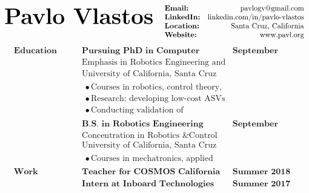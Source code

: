 \documentclass[paper=a4,fontsize=11pt]{article} %
\begin{document}
\begin{align*}
	\text{\fontsize{30}{36}\selectfont \textbf{Pavlo Vlastos}} & \hfill & \begin{array}{lr}
	\textbf{Email:} & \text{pavlogv@gmail.com}\\
	\textbf{LinkedIn:} & \text{linkedin.com/in/pavlo-vlastos}\\
	\textbf{Location:} & \text{Santa Cruz, California}\\
	\textbf{Website:} & \text{www.pavl.org}
	\end{array} 
\end{align*}
%
\begin{align*}
	& \textbf{Education} & & \textbf{Pursuing PhD in Computer Engineering} & \textbf{September 2017 - Current} & \\
	& & & \text{Emphasis in Robotics Engineering and Control Theory} & & \\
	& & & \text{University of California, Santa Cruz} & & \\
	& & & \begin{array}{l} 
		\bullet \, \text{Courses in robotics, control theory, attitude estimation, and embedded programming} \\
		\bullet \, \text{Research: developing low-cost ASVs for oceanography} \\
		\bullet \, \text{Conducting validation of Complementary Filter-based AHRS.}
	\end{array} & & \\
	& & & \textbf{B.S. in Robotics Engineering} & \textbf{September 2013 - June 2017} & \\
	& & & \text{Concentration in Robotics \& Control} & & \\
	& & & \text{University of California, Santa Cruz} & & \\
	& & & \begin{array}{l} 
	\bullet \, \text{Courses in mechatronics, applied linear algebra, and feedback control}
	\end{array} & & \\
	& \textbf{Work Experience} & & \textbf{Teacher for COSMOS California Summer School for Mathematics \& Science} & \textbf{Summer 2018} & \\
	& & & \textbf{Intern at Inboard Technologies} & \textbf{Summer 2017} & 
\end{align*}
\end{document}
